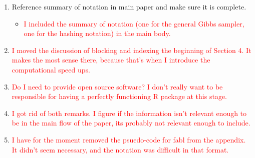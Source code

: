 \documentclass[letterpaper, parskip]{scrartcl}
\begin{document}
\begin{enumerate}
\item Reference summary of notation in main paper and make sure it is complete. 
\begin{itemize}
	\item \textcolor{red}{I included the summary of notation (one for the general Gibbs sampler, one for the hashing notation) in the main body.}
\end{itemize}


\item \textcolor{red}{I moved the discussion of blocking and indexing the beginning of Section 4. It makes the most sense there, because that's when I introduce the computational speed ups.}


\item \textcolor{red}{Do I need to provide open source software? I don't really want to be responsible for having a perfectly functioning R package at this stage.}

\item \textcolor{red}{I got rid of both remarks. I figure if the information isn't relevant enough to be in the main flow of the paper, its probably not relevant enough to include.}

\item \textcolor{red}{I have for the moment removed the psuedo-code for fabl from the appendix. It didn't seem necessary, and the notation was difficult in that format.}

\end{enumerate}
\end{document}
